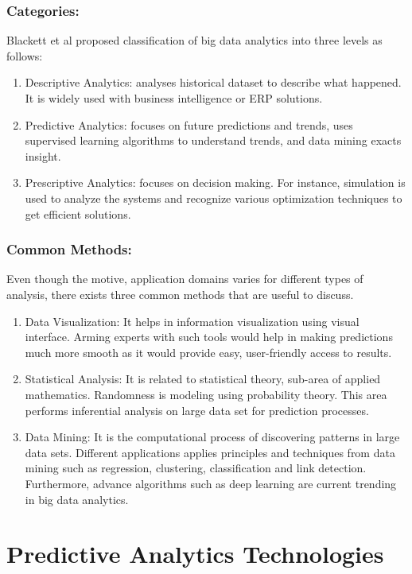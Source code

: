 \documentclass[runningheads]{llncs}
\begin{document}
\subsubsection{Categories:}
Blackett et al \cite{10} proposed classification of big data analytics into three levels as follows:
\begin{enumerate}
	\item Descriptive Analytics: analyses historical dataset to describe what happened. It is widely used with business intelligence or ERP solutions.
	\item Predictive Analytics: focuses on future predictions and trends, uses supervised learning algorithms to understand trends, and data mining exacts insight.
	\item Prescriptive Analytics: focuses on decision making. For instance, simulation is used to analyze the systems and recognize various optimization techniques to get efficient solutions.
\end{enumerate}
\subsubsection{Common Methods:}Even though the motive, application domains varies for different types of analysis, there exists three common methods that are useful to discuss.
\begin{enumerate}
	\item Data Visualization: It helps in information visualization using visual interface. Arming experts with such tools would help in making predictions much more smooth as it would provide easy, user-friendly access to results.
	\item Statistical Analysis: It is related to statistical theory, sub-area of applied mathematics. Randomness is modeling using probability theory. This area performs inferential analysis on large data set for prediction processes.
	\item Data Mining: It is the computational process of discovering patterns in large data sets.\cite{5} Different applications applies principles and techniques from data mining such as regression, clustering, classification and link detection. Furthermore, advance algorithms such as deep learning are current trending in big data analytics.
\end{enumerate}


\section{Predictive Analytics Technologies}
\end{document}
